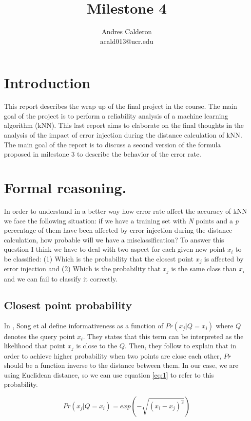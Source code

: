 \documentclass{article}
\title{Milestone 4}
\author{Andres Calderon \\ acald013@ucr.edu}
\begin{document}
\maketitle

\section{Introduction}
This report describes the wrap up of the final project in the course. The main goal of the project is to perform a reliability analysis of a machine learning algorithm (kNN).  This last report aims to elaborate on the final thoughts in the analysis of the impact of error injection during the distance calculation of kNN.  The main goal of the report is to discuss a second version of the formula proposed in milestone 3 to describe the behavior of the error rate.  

\section{Formal reasoning.}\label{sec:formal}
In order to understand in a better way how error rate affect the accuracy of kNN we face the following situation:  if we have a training set with \textit{N} points and a \textit{p} percentage of them have been affected by error injection during the distance calculation, how probable will we have a misclassification? To answer this question I think we have to deal with two aspect for each given new point $x_i$ to be classified: (1) Which is the probability that the closest point $x_j$ is affected by error injection and (2) Which is the probability that $x_j$ is the same class than $x_i$ and we can fail to classify it correctly.

\subsection{Closest point probability}
In \cite{song_iknn:_2007}, Song et al define informativeness as a function of $Pr(x_j|Q=x_i)$ where $Q$ denotes the query point $x_i$.  They states that this term can be interpreted as the likelihood that point $x_j$ is close to the $Q$.  Then, they follow to explain that in order to achieve higher probability when two points are close each other, $Pr$ should be a function inverse to the distance between them.  In our case, we are using Euclidean distance, so we can use equation \ref{eq:1} to refer to this probability.

\begin{equation}\label{eq:1}
 Pr(x_j|Q=x_i) = exp(-\sqrt{(x_i-x_j)^2})
\end{equation}
\end{document}
